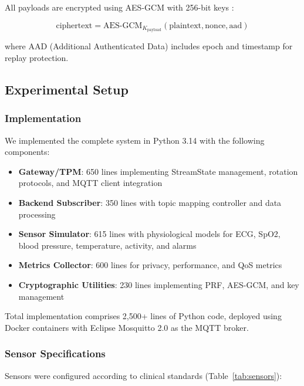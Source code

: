 \documentclass[conference]{IEEEtran}
\begin{document}
All payloads are encrypted using AES-GCM with 256-bit keys \cite{lightweight_ciphers_mqtt, e2e_encryption_industry40}:

\begin{equation}
\text{ciphertext} = \text{AES-GCM}_{K_{\text{payload}}}(\text{plaintext}, \text{nonce}, \text{aad})
\label{eq:encryption}
\end{equation}

where AAD (Additional Authenticated Data) includes epoch and timestamp for replay protection.

\subsection{Experimental Setup}

\subsubsection{Implementation}

We implemented the complete system in Python 3.14 with the following components:

\begin{itemize}
    \item \textbf{Gateway/TPM}: 650 lines implementing StreamState management, rotation protocols, and MQTT client integration
    \item \textbf{Backend Subscriber}: 350 lines with topic mapping controller and data processing
    \item \textbf{Sensor Simulator}: 615 lines with physiological models for ECG, SpO2, blood pressure, temperature, activity, and alarms
    \item \textbf{Metrics Collector}: 600 lines for privacy, performance, and QoS metrics
    \item \textbf{Cryptographic Utilities}: 230 lines implementing PRF, AES-GCM, and key management
\end{itemize}

Total implementation comprises 2,500+ lines of Python code, deployed using Docker containers with Eclipse Mosquitto 2.0 as the MQTT broker.

\subsubsection{Sensor Specifications}

Sensors were configured according to clinical standards (Table~\ref{tab:sensors}):
\end{document}
